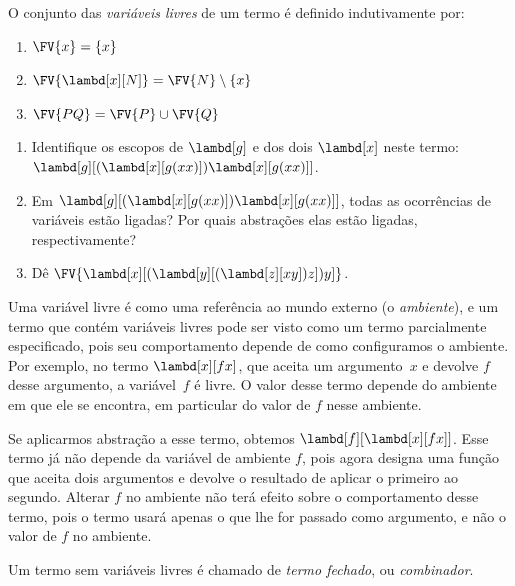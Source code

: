 \documentclass[../../../include/open-logic-section]{subfiles}
\begin{document}
\begin{defn} 
  O conjunto das \emph{variáveis livres} de um termo é definido
  indutivamente por:
  \begin{enumerate}
    \item $\FV{x} = \{x\}$  
    \item $\FV{\lambd[x][N]} = \FV{N} \setminus \{x\}$    
    \item $\FV{PQ} = \FV{P} \cup \FV{Q}$ 
  \end{enumerate}
\end{defn}

\begin{prob}
  \begin{enumerate}
  \item Identifique os escopos de $\lambd[g]$ e dos dois $\lambd[x]$ neste
    termo: $\lambd[g][(\lambd[x][g (x x)]) \lambd[x][g (x x)]]$.
  \item Em $\lambd[g][(\lambd[x][g (x x)]) \lambd[x][g (x x)]]$, todas as
    ocorrências de variáveis estão ligadas? Por quais abstrações elas estão
    ligadas, respectivamente?
    \item Dê $\FV{\lambd[x][(\lambd[y][(\lambd[z][x y]) z]) y]}$.
  \end{enumerate}
\end{prob}

\begin{explain}
Uma variável livre é como uma referência ao mundo externo (o
\emph{ambiente}), e um termo que contém variáveis livres pode ser visto como
um termo parcialmente especificado, pois seu comportamento depende de como
configuramos o ambiente. Por exemplo, no termo $\lambd[x][f x]$, que aceita
um argumento~$x$ e devolve $f$ desse argumento, a variável~$f$ é livre. O
valor desse termo depende do ambiente em que ele se encontra, em particular
do valor de $f$ nesse ambiente.

Se aplicarmos abstração a esse termo, obtemos $\lambd[f][\lambd[x][f
    x]]$. Esse termo já não depende da variável de ambiente $f$, pois agora
designa uma função que aceita dois argumentos e devolve o resultado de
aplicar o primeiro ao segundo. Alterar $f$ no ambiente não terá efeito sobre
o comportamento desse termo, pois o termo usará apenas o que lhe for
passado como argumento, e não o valor de $f$ no ambiente.
\end{explain}

\begin{defn}
  Um termo sem variáveis livres é chamado de \emph{termo fechado}, ou
  \emph{combinador}.
\end{defn}
\end{document}
